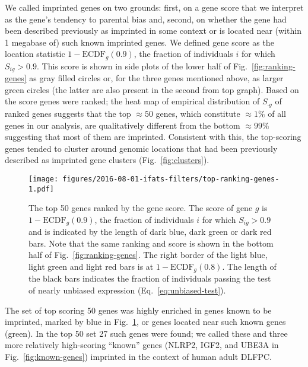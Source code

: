 \documentclass[letterpaper]{article}
\begin{document}
We called imprinted genes on two grounds: first, on a gene score that we
interpret as the gene's tendency to parental bias and, second, on whether the
gene had been described previously as imprinted in some context or is located near (within 1
megabase of) such known imprinted genes.  We defined gene score as the
location statistic \(1 - \mathrm{ECDF}_g(0.9)\), the fraction of individuals
\(i\) for which \(S_{ig}>0.9\).  This score is shown in side plots of the
lower half of Fig.~\ref{fig:ranking-genes} as gray filled circles or, for the
three genes mentioned above, as larger green circles (the latter are also
present in the second from top graph).  Based on the score genes were ranked;
the heat map of empirical distribution of \(S_{\cdot g}\) of ranked genes
suggests that the top \(\approx 50\) genes, which constitute \(\approx 1\%\)
of all genes in our analysis, are qualitatively different from the bottom
\(\approx 99\%\) suggesting that most of them are imprinted.  Consistent with
this, the top-scoring genes tended to cluster around genomic locations that
had been previously described as imprinted gene clusters
(Fig.~\ref{fig:clusters}).

\begin{figure}
\begin{center}
\texttt{[image: figures/2016-08-01-ifats-filters/top-ranking-genes-1.pdf]}
\caption{
The top 50 genes ranked by the gene score.  The score of gene \(g\) is \(1 -
\mathrm{ECDF}_g(0.9)\), the fraction of individuals \(i\) for which
\(S_{ig}>0.9\) and is indicated by the length of dark blue, dark green or dark
red bars.  Note that the same ranking and score is shown in the bottom half of
Fig.~\ref{fig:ranking-genes}.  The right border of the light blue, light green
and light red bars is at \(1 - \mathrm{ECDF}_g(0.8)\).  The length of the
black bars indicates the fraction of individuals passing the test of nearly
unbiased expression (Eq.~\ref{eq:unbiased-test}).
}
\label{fig:top-genes}
\end{center}
\end{figure}

The set of top scoring 50 genes was highly enriched in genes known to be
imprinted, marked by blue in Fig.~\ref{fig:top-genes}, or genes located near
such known genes (green).  In the top 50 set 27 such genes were found; we
called these and three more relatively high-scoring ``known'' genes (NLRP2,
IGF2, and UBE3A in Fig.~\ref{fig:known-genes}) imprinted in the context of
human adult DLFPC.
\end{document}
